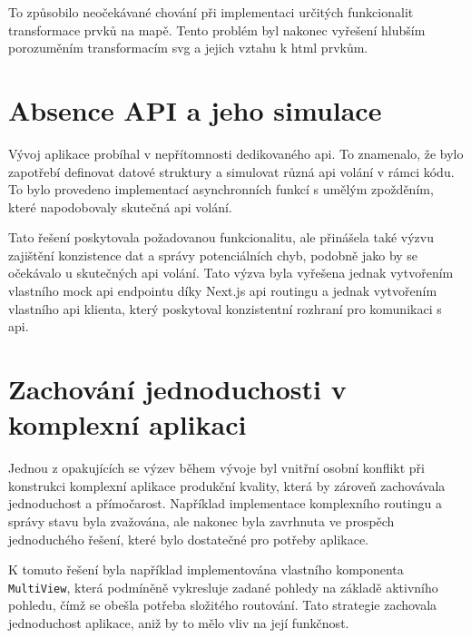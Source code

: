 To způsobilo neočekávané chování při implementaci určitých funkcionalit transformace prvků na mapě.
Tento problém byl nakonec vyřešení hlubším porozuměním transformacím \ac{svg} a jejich vztahu k \ac{html} prvkům.

\section{Absence API a jeho simulace}
\label{sec:vyzvy-a-problemy-absence-api}
Vývoj aplikace probíhal v nepřítomnosti dedikovaného \ac{api}.
To znamenalo, že bylo zapotřebí definovat datové struktury a simulovat různá \ac{api} volání v rámci kódu.
To bylo provedeno implementací asynchronních funkcí s umělým zpožděním, které napodobovaly skutečná \ac{api} volání.

Tato řešení poskytovala požadovanou funkcionalitu, ale přinášela také výzvu zajištění konzistence dat a správy potenciálních chyb, podobně jako by se očekávalo u skutečných \ac{api} volání.
Tato výzva byla vyřešena jednak vytvořením vlastního mock \ac{api} endpointu díky Next.js \ac{api} routingu\cite{n_basics_api_routes} a jednak vytvořením vlastního \ac{api} klienta, který poskytoval konzistentní rozhraní pro komunikaci s \ac{api}.

\section{Zachování jednoduchosti v komplexní aplikaci}
\label{sec:vyzvy-a-problemy-zachovani-jednoduchosti}
Jednou z opakujících se výzev během vývoje byl vnitřní osobní konflikt při konstrukci komplexní aplikace produkční kvality, která by zároveň zachovávala jednoduchost a přímočarost.
Například implementace komplexního routingu a správy stavu byla zvažována, ale nakonec byla zavrhnuta ve prospěch jednoduchého řešení, které bylo dostatečné pro potřeby aplikace.

K tomuto řešení byla například implementována vlastního komponenta \texttt{MultiView}, která podmíněně vykresluje zadané pohledy na základě aktivního pohledu, čímž se obešla potřeba složitého routování.
Tato strategie zachovala jednoduchost aplikace, aniž by to mělo vliv na její funkčnost.

